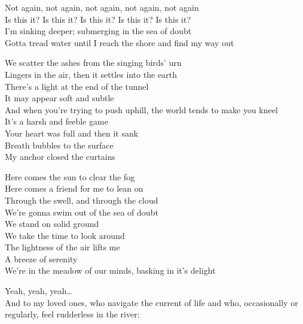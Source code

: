
Not again, not again, not again, not again, not again\\
Is this it? Is this it? Is this it? Is this it? Is this it?\\
I'm sinking deeper; submerging in the sea of doubt\\
Gotta tread water until I reach the shore and find my way out\\


We scatter the ashes from the singing birds' urn\\
Lingers in the air, then it settles into the earth\\
There's a light at the end of the tunnel\\
It may appear soft and subtle\\
And when you're trying to push uphill, the world tends to make you kneel\\
It's a harsh and feeble game\\
Your heart was full and then it sank\\
Breath bubbles to the surface\\
My anchor closed the curtains\\


Here comes the sun to clear the fog\\
Here comes a friend for me to lean on\\
Through the swell, and through the cloud\\
We're gonna swim out of the sea of doubt\\

We stand on solid ground\\
We take the time to look around\\
The lightness of the air lifts me\\
A breeze of serenity\\
We're in the meadow of our minds, basking in it's delight\\




Yeah, yeah, yeah…\\
And to my loved ones, who navigate the current of life and who, occasionally or regularly, feel rudderless in the river:\\

